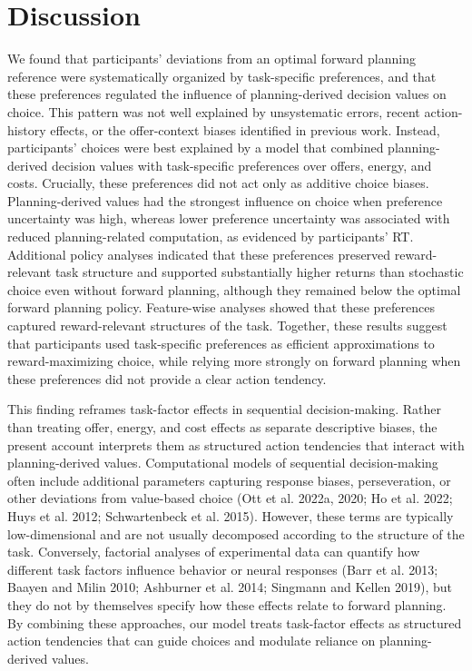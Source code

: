 \documentclass[
  letterpaper,
  DIV=11,
  numbers=noendperiod]{scrartcl}
\begin{document}
\section{Discussion}\label{discussion}

We found that participants' deviations from an optimal forward planning
reference were systematically organized by task-specific preferences,
and that these preferences regulated the influence of planning-derived
decision values on choice. This pattern was not well explained by
unsystematic errors, recent action-history effects, or the offer-context
biases identified in previous work. Instead, participants' choices were
best explained by a model that combined planning-derived decision values
with task-specific preferences over offers, energy, and costs.
Crucially, these preferences did not act only as additive choice biases.
Planning-derived values had the strongest influence on choice when
preference uncertainty was high, whereas lower preference uncertainty
was associated with reduced planning-related computation, as evidenced
by participants' RT. Additional policy analyses indicated that these
preferences preserved reward-relevant task structure and supported
substantially higher returns than stochastic choice even without forward
planning, although they remained below the optimal forward planning
policy. Feature-wise analyses showed that these preferences captured
reward-relevant structures of the task. Together, these results suggest
that participants used task-specific preferences as efficient
approximations to reward-maximizing choice, while relying more strongly
on forward planning when these preferences did not provide a clear
action tendency.

This finding reframes task-factor effects in sequential decision-making.
Rather than treating offer, energy, and cost effects as separate
descriptive biases, the present account interprets them as structured
action tendencies that interact with planning-derived values.
Computational models of sequential decision-making often include
additional parameters capturing response biases, perseveration, or other
deviations from value-based choice (Ott et al. 2022a, 2020; Ho et al.
2022; Huys et al. 2012; Schwartenbeck et al. 2015). However, these terms
are typically low-dimensional and are not usually decomposed according
to the structure of the task. Conversely, factorial analyses of
experimental data can quantify how different task factors influence
behavior or neural responses (Barr et al. 2013; Baayen and Milin 2010;
{Ashburner et al.} 2014; Singmann and Kellen 2019), but they do not by
themselves specify how these effects relate to forward planning. By
combining these approaches, our model treats task-factor effects as
structured action tendencies that can guide choices and modulate
reliance on planning-derived values.
\end{document}
